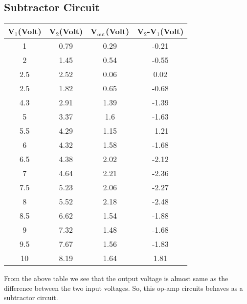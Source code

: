 \documentclass[12pt]{article}
\begin{document}
\subsection{Subtractor Circuit}
\begin{table}[H]
	\centering
	\begin{tabular}{|c|c|c|c|}
		\hline
		V$_1$(Volt) & V$_2$(Volt) & V$_\mathrm{out}$(Volt) & V$_2$-V$_1$(Volt) \\ \hline \hline
		1                    & 0.79                 & 0.29                   & -0.21                       \\ \hline
		2                    & 1.45                 & 0.54                   & -0.55                       \\ \hline
		2.5                  & 2.52                 & 0.06                   & 0.02                        \\ \hline
		2.5                  & 1.82                 & 0.65                   & -0.68                       \\ \hline
		4.3                  & 2.91                 & 1.39                   & -1.39                       \\ \hline
		5                    & 3.37                 & 1.6                    & -1.63                       \\ \hline
		5.5                  & 4.29                 & 1.15                   & -1.21                       \\ \hline
		6                    & 4.32                 & 1.58                   & -1.68                       \\ \hline
		6.5                  & 4.38                 & 2.02                   & -2.12                       \\ \hline
		7                    & 4.64                 & 2.21                   & -2.36                       \\ \hline
		7.5                  & 5.23                 & 2.06                   & -2.27                       \\ \hline
		8                    & 5.52                 & 2.18                   & -2.48                       \\ \hline
		8.5                  & 6.62                 & 1.54                   & -1.88                       \\ \hline
		9                    & 7.32                 & 1.48                   & -1.68                       \\ \hline
		9.5                  & 7.67                 & 1.56                   & -1.83                       \\ \hline
		10                   & 8.19                 & 1.64                   & 1.81                        \\ \hline
	\end{tabular}
\end{table}
From the above table we see that the output voltage is almost same as the difference between the two input voltages. So, this op-amp circuits behaves as a subtractor circuit. 
\end{document}
